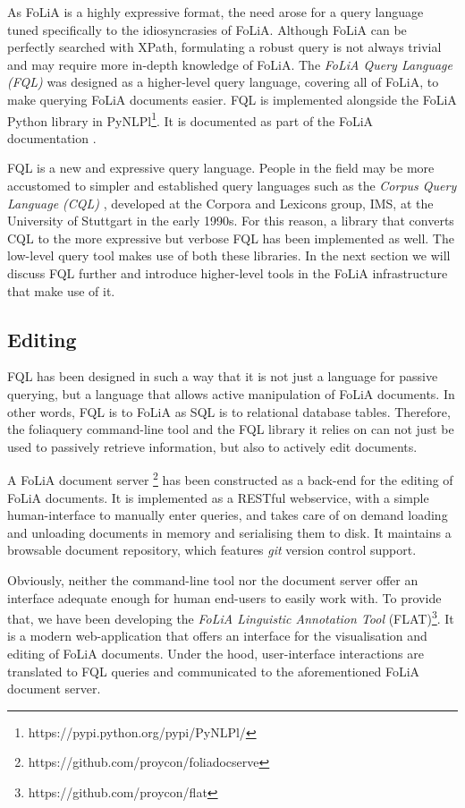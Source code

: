 \documentclass[a4paper,11pt]{article}
\begin{document}
As FoLiA is a highly expressive format, the need arose for a query language
tuned specifically to the idiosyncrasies of FoLiA. Although FoLiA can be
perfectly searched with XPath, formulating a robust query is not always trivial
and may require more in-depth knowledge of FoLiA. The \emph{FoLiA Query
Language (FQL)} was designed as a higher-level query language, covering all of
FoLiA, to make querying FoLiA documents easier. FQL is implemented alongside
the FoLiA Python library in
PyNLPl\footnote{https://pypi.python.org/pypi/PyNLPl/}. It is documented as part
of the FoLiA documentation \cite{FOLIADOC2014}.

FQL is a new and expressive query language. People in the field may be more
accustomed to simpler and established query languages such as the \emph{Corpus
Query Language (CQL)} \cite{CQL}, developed at the Corpora and Lexicons group,
IMS, at the University of Stuttgart in the early 1990s. For this reason, a
library that converts CQL to the more expressive but verbose FQL has been
implemented as well. The low-level query tool makes use of both these libraries. In the
next section we will discuss FQL further and introduce higher-level tools in
the FoLiA infrastructure that make use of it.

\subsection{Editing}

FQL has been designed in such a way that it is not just a language for passive
querying, but a language that allows active manipulation of FoLiA documents. In
other words, FQL is to FoLiA as SQL is to relational database tables.
Therefore, the foliaquery command-line tool and the FQL library it relies on
can not just be used to passively retrieve information, but also to actively
edit documents.

A FoLiA document server \footnote{https://github.com/proycon/foliadocserve} has
been constructed as a back-end for the editing of FoLiA documents. It is
implemented as a RESTful webservice, with a simple human-interface to manually
enter queries, and takes care of on demand loading and unloading documents in
memory and serialising them to disk. It maintains a browsable document
repository, which features \emph{git} version control support.

Obviously, neither the command-line tool nor the document server offer an
interface adequate enough for human end-users to easily work with. To provide
that, we have been developing the \emph{FoLiA Linguistic Annotation Tool}
(FLAT)\footnote{https://github.com/proycon/flat}. It is a modern
web-application that offers an interface for the visualisation and editing of
FoLiA documents. Under the hood, user-interface interactions are translated to FQL
queries and communicated to the aforementioned FoLiA document server.
\end{document}

